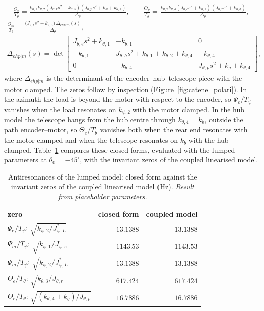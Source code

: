 \documentclass[10pt,a4paper]{article}
\numberwithin{equation}{section}
\begin{document}
\begin{gather}
\frac{\Theta_e}{T_\theta} = \frac{k_{\theta,1} k_{\theta,2} \left(J_{\theta,r} s^{2} + k_{\theta,3}\right) \left(J_{\theta,p} s^{2} + k_{g} + k_{\theta,4}\right)}{\Delta_\theta},\qquad \frac{\Theta_p}{T_\theta} = \frac{k_{\theta,2} k_{\theta,4} \left(J_{\theta,e} s^{2} + k_{\theta,1}\right) \left(J_{\theta,r} s^{2} + k_{\theta,3}\right)}{\Delta_\theta},
\end{gather}
\begin{gather}
\frac{\Theta_m}{T_\theta} = \frac{\bigl(J_{\theta,r}s^2 + k_{\theta,3}\bigr)\,\Delta_{ehp|m}(s)}{\Delta_\theta}, \\ \Delta_{ehp|m}(s) = \det\left[\begin{matrix}J_{\theta,e} s^{2} + k_{\theta,1} & - k_{\theta,1} & 0\\- k_{\theta,1} & J_{\theta,h} s^{2} + k_{\theta,1} + k_{\theta,2} + k_{\theta,4} & - k_{\theta,4}\\0 & - k_{\theta,4} & J_{\theta,p} s^{2} + k_{g} + k_{\theta,4}\end{matrix}\right],
\end{gather}
where $\Delta_{ehp|m}$ is the determinant of the encoder--hub--telescope piece with the motor clamped.
The zeros follow by inspection (Figure~\ref{fig:catene_polari}). In the azimuth the load is beyond the motor with respect to the encoder, so $\Psi_e/T_\psi$ vanishes when the load resonates on $k_{\psi,2}$ with the motor clamped. In the hub model the telescope hangs from the hub centre through $k_{\theta,4} = k_b$, outside the path encoder--motor, so $\Theta_e/T_\theta$ vanishes both when the rear end resonates with the motor clamped and when the telescope resonates on $k_b$ with the hub clamped. Table~\ref{tab:lump_zeros} compares these closed forms, evaluated with the lumped parameters at $\theta_0 = -45^\circ$, with the invariant zeros of the coupled linearised model.
\begin{table}[H]\centering\small
\caption{Antiresonances of the lumped model: closed form against the invariant zeros of the coupled linearised model (Hz). \emph{Result from placeholder parameters.}}\label{tab:lump_zeros}
\begin{tabular}{lrr}\toprule
zero & closed form & coupled model \\ \midrule
$\Psi_e/T_\psi$: $\sqrt{k_{\psi,2}/J_{\psi,L}^*}$ & $13.1388$ & $13.1388$ \\
$\Psi_m/T_\psi$: $\sqrt{k_{\psi,1}/J_{\psi,e}}$ & $1143.53$ & $1143.53$ \\
$\Psi_m/T_\psi$: $\sqrt{k_{\psi,2}/J_{\psi,L}^*}$ & $13.1388$ & $13.1388$ \\
$\Theta_e/T_\theta$: $\sqrt{k_{\theta,3}/J_{\theta,r}}$ & $617.424$ & $617.424$ \\
$\Theta_e/T_\theta$: $\sqrt{(k_{\theta,4} + k_g)/J_{\theta,p}}$ & $16.7886$ & $16.7886$ \\
\bottomrule\end{tabular}\end{table}
\end{document}
